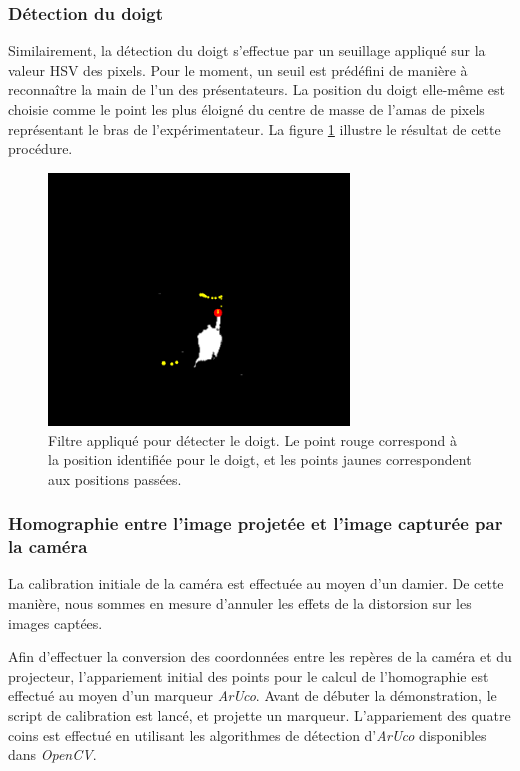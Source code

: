\documentclass[11pt]{report}
\begin{document}
\subsubsection{Détection du doigt}
Similairement, la détection du doigt s'effectue par un seuillage appliqué sur la
valeur HSV des pixels. Pour le moment, un seuil est prédéfini de manière à
reconnaître la main de l'un des présentateurs. La position du doigt elle-même
est choisie comme le point les plus éloigné du centre de masse de l'amas de
pixels représentant le bras de l'expérimentateur. La figure
\ref{detection_doigt} illustre le résultat de cette procédure.

\begin{figure}[h]
  \centering
  \includegraphics[width=8cm]{detection-doigt.png}
  \caption{Filtre appliqué pour détecter le doigt. Le point rouge correspond à
    la position identifiée pour le doigt, et les points jaunes correspondent aux
    positions passées.}
  \label{detection_doigt}
\end{figure}


\subsubsection{Homographie entre l'image projetée et l'image capturée par la
  caméra}
La calibration initiale de la caméra est effectuée au moyen d'un damier. De
cette manière, nous sommes en mesure d'annuler les effets de la distorsion sur
les images captées.

Afin d'effectuer la conversion des coordonnées entre les repères de la caméra et
du projecteur, l'appariement initial des points pour le calcul de l'homographie
est effectué au moyen d'un marqueur \textit{ArUco}. Avant de débuter la
démonstration, le script de calibration est lancé, et projette un marqueur.
L'appariement des quatre coins est effectué en utilisant les algorithmes de
détection d'\textit{ArUco} disponibles dans \textit{OpenCV}. 
\end{document}
